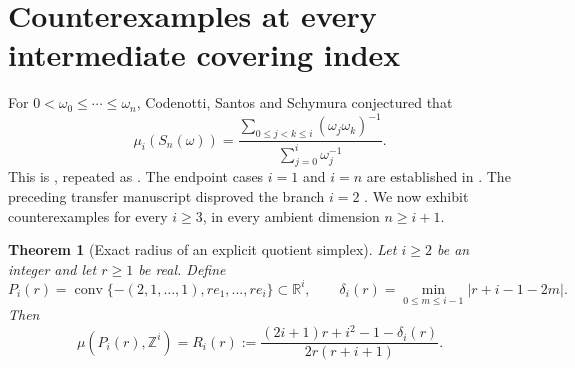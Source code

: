 \documentclass[11pt,a4paper]{article}
\newtheorem{theorem}{Theorem}[section]
\theoremstyle{remark}\newtheorem{remark}[theorem]{Remark}
\begin{document}

\section{Counterexamples at every intermediate covering index}
\label{r3m:sec-counterexamples}

For $0<\omega_0\le\cdots\le\omega_n$, Codenotti, Santos and Schymura
conjectured that
\begin{equation}
\label{r3m:eq-css-prediction}
 \mu_i(S_n(\omega))
 =
 \frac{\displaystyle\sum_{0\le j<k\le i}
               (\omega_j\omega_k)^{-1}}
      {\displaystyle\sum_{j=0}^{i}\omega_j^{-1}}.
\end{equation}
This is \cite[Conjecture~5.3]{CSS}, repeated as
\cite[Conjecture~5.3]{Krivokuca}.  The endpoint cases $i=1$ and $i=n$
are established in \cite{CSS}.  The preceding transfer manuscript
disproved the branch $i=2$ \cite{TransferTwo}.  We now exhibit
counterexamples for every $i\ge3$, in every ambient dimension $n\ge i+1$.

\begin{theorem}[Exact radius of an explicit quotient simplex]
\label{r3m:thm-quotient-radius}
Let $i\ge2$ be an integer and let $r\ge1$ be real.  Define
\[
 P_i(r)=\operatorname{conv}
  \{-(2,1,\ldots,1),re_1,\ldots,re_i\}\subset\mathbb R^i,
 \qquad
 \delta_i(r)=\min_{0\le m\le i-1}|r+i-1-2m|.
\]
Then
\begin{equation}
\label{r3m:eq-exact-quotient}
 \mu(P_i(r),\mathbb Z^i)=R_i(r)
 :=
 \frac{(2i+1)r+i^2-1-\delta_i(r)}
      {2r(r+i+1)}.
\end{equation}
\end{theorem}
\end{document}
